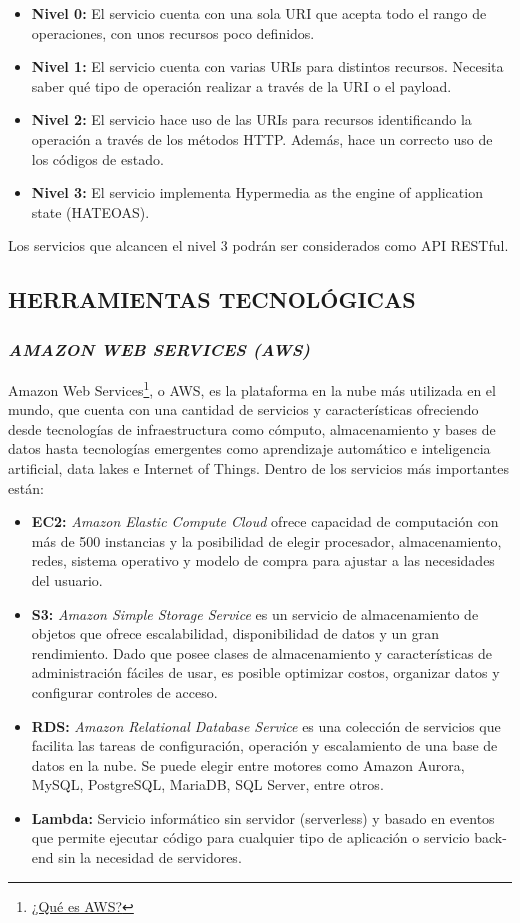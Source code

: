 \begin{itemize}
    \item \textbf{Nivel 0:} El servicio cuenta con una sola URI que acepta todo el rango de operaciones, con unos recursos poco definidos.
    \item \textbf{Nivel 1:} El servicio cuenta con varias URIs para distintos recursos. Necesita saber qué tipo de operación realizar a través de la URI o el payload.
    \item \textbf{Nivel 2:} El servicio hace uso de las URIs para recursos identificando la operación a través de los métodos HTTP. Además, hace un correcto uso de los códigos de estado.
    \item \textbf{Nivel 3:} El servicio implementa Hypermedia as the engine of application state (HATEOAS).
\end{itemize}
Los servicios que alcancen el nivel 3 podrán ser considerados como API RESTful.

\subsection{HERRAMIENTAS TECNOLÓGICAS}

\subsubsection{\textit{AMAZON WEB SERVICES (AWS)} }

Amazon Web Services\footnote{\href{https://aws.amazon.com/es/what-is-aws/}{¿Qué es AWS?}}, o AWS, es la plataforma en la nube más utilizada en el mundo, que cuenta con una cantidad de servicios y características ofreciendo desde tecnologías de infraestructura como cómputo, almacenamiento y bases de datos hasta tecnologías emergentes como aprendizaje automático e inteligencia artificial, data lakes e Internet of Things. Dentro de los servicios más importantes están:
\begin{itemize}
    \item \textbf{EC2:} \textit{Amazon Elastic Compute Cloud} ofrece capacidad de computación con más de 500 instancias y la posibilidad de elegir procesador, almacenamiento, redes, sistema operativo y modelo de compra para ajustar a las necesidades del usuario.
    \item \textbf{S3:} \textit{Amazon Simple Storage Service} es un servicio de almacenamiento de objetos que ofrece escalabilidad, disponibilidad de datos y un gran rendimiento. Dado que posee clases de almacenamiento y características de administración fáciles de usar, es posible optimizar costos, organizar datos y configurar controles de acceso.
    \item \textbf{RDS:} \textit{Amazon Relational Database Service} es una colección de servicios que facilita las tareas de configuración, operación y escalamiento de una base de datos en la nube. Se puede elegir entre motores como Amazon Aurora, MySQL, PostgreSQL, MariaDB, SQL Server, entre otros.
    \item \textbf{Lambda:} Servicio informático sin servidor (serverless) y basado en eventos que permite ejecutar código para cualquier tipo de aplicación o servicio back-end sin la necesidad de servidores.
\end{itemize}

